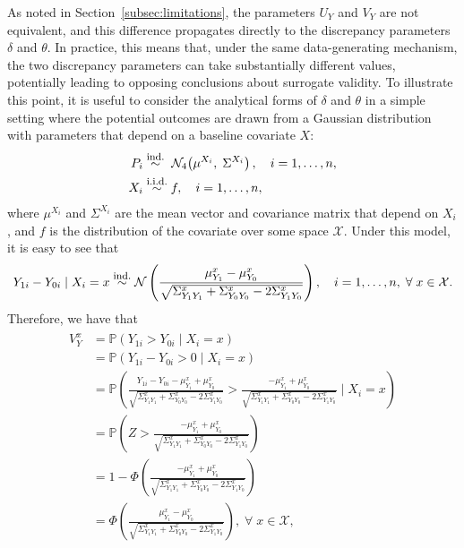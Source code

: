 \documentclass[12pt]{article}
\newcommand{\Prob}{\mathbb{P}}
\newcommand{\iid}{\overset{\text{\footnotesize i.i.d.}}{\sim}}
\begin{document}
As noted in Section~\ref{subsec:limitations}, the parameters \(U_{Y}\) and \(V_{Y}\) are not equivalent, and this difference propagates directly to the discrepancy parameters \(\delta\) and \(\theta\). In practice, this means that, under the same data-generating mechanism, the two discrepancy parameters can take substantially different values, potentially leading to opposing conclusions about surrogate validity. To illustrate this point, it is useful to consider the analytical forms of \(\delta\) and \(\theta\) in a simple setting where the potential outcomes are drawn from a Gaussian distribution with parameters that depend on a baseline covariate \(X\):
\begin{equation}
  \label{eq:data_generating_process_covariates}
  \begin{aligned}
    P_{i} &\overset{\text{\footnotesize ind.}}{\sim}\;
    \mathcal{N}_{4}\!\left( \mu^{X_{i}} ,\; \Sigma^{X_{i}} \right), \quad i=1,\ldots,n, \\
    X_{i} &\iid f, \quad i = 1, \ldots, n,
  \end{aligned}
\end{equation}
where \(\mu^{X_{i}}\) and \(\Sigma^{X_{i}}\) are the mean vector and covariance matrix that depend on \(X_{i}\), and \(f\) is the distribution of the covariate over some space \(\mathcal{X}\). Under this model, it is easy to see that
\begin{align}
    Y_{1i} - Y_{0i} \mid X_{i} = x \overset{\text{\footnotesize ind.}}{\sim} \mathcal{N} \left( \frac{ \mu^{x}_{Y_{1}} - \mu^{x}_{Y_{0}}}{\sqrt{\Sigma^{x}_{Y_{1} Y_{1}} + \Sigma^{x}_{Y_{0} Y_{0}} - 2 \Sigma^{x}_{Y_{1} Y_{0}}}} \right), \quad i = 1, \ldots, n, \; \forall \; x \in \mathcal{X}.
\end{align}
Therefore, we have that
\begin{align}
    \begin{split}
        V^{x}_{Y} & = \Prob \left( Y_{1i} > Y_{0i} \mid X_{i} = x \right) \\
        & = \Prob \left( Y_{1i} - Y_{0i} > 0 \mid X_{i} = x \right) \\
        & = \Prob \left( \frac{Y_{1i} - Y_{0i} - \mu^{x}_{Y_{1}} + \mu^{x}_{Y_{0}}}{\sqrt{\Sigma^{x}_{Y_{1} Y_{1}} + \Sigma^{x}_{Y_{0} Y_{0}} - 2 \Sigma^{x}_{Y_{1} Y_{0}}}} > \frac{- \mu^{x}_{Y_{1}} + \mu^{x}_{Y_{0}}}{\sqrt{\Sigma^{x}_{Y_{1} Y_{1}} + \Sigma^{x}_{Y_{0} Y_{0}} - 2 \Sigma^{x}_{Y_{1} Y_{0}}}} \mid X_{i} = x \right) \\
        & = \Prob \left( Z > \frac{- \mu^{x}_{Y_{1}} + \mu^{x}_{Y_{0}}}{\sqrt{\Sigma^{x}_{Y_{1} Y_{1}} + \Sigma^{x}_{Y_{0} Y_{0}} - 2 \Sigma^{x}_{Y_{1} Y_{0}}}} \right) \\
        & = 1 - \Phi \left( \frac{- \mu^{x}_{Y_{1}} + \mu^{x}_{Y_{0}}}{\sqrt{\Sigma^{x}_{Y_{1} Y_{1}} + \Sigma^{x}_{Y_{0} Y_{0}} - 2 \Sigma^{x}_{Y_{1} Y_{0}}}} \right) \\
        & = \Phi \left( \frac{ \mu^{x}_{Y_{1}} - \mu^{x}_{Y_{0}}}{\sqrt{\Sigma^{x}_{Y_{1} Y_{1}} + \Sigma^{x}_{Y_{0} Y_{0}} - 2 \Sigma^{x}_{Y_{1} Y_{0}}}} \right), \; \forall \; x \in \mathcal{X},
    \end{split}
\end{align}
\end{document}
